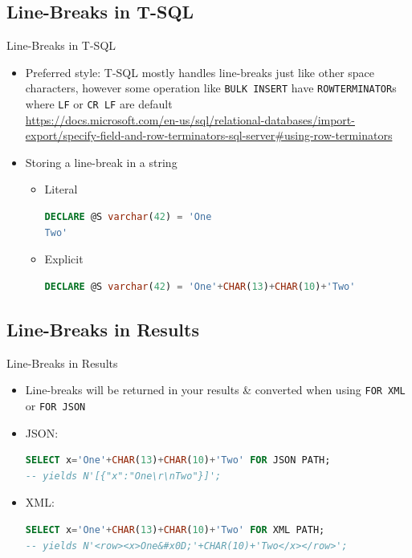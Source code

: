 \documentclass[english,aspectratio=169]{beamer}
\begin{document}
\subsection{Line-Breaks in T-SQL}
\begin{frame}[fragile]{Line-Breaks in T-SQL}
\begin{itemize}
\item Preferred style: T-SQL mostly handles line-breaks just like other space characters, however some operation like \texttt{BULK INSERT} have \texttt{ROWTERMINATOR}s where \texttt{LF} or \texttt{CR LF} are default\\
    \url{https://docs.microsoft.com/en-us/sql/relational-databases/import-export/specify-field-and-row-terminators-sql-server#using-row-terminators}
\item Storing a line-break in a string
    \begin{itemize}
    \item Literal \begin{lstlisting}[language=SQL]
DECLARE @S varchar(42) = 'One
Two'
    \end{lstlisting}
    \item Explicit \begin{lstlisting}[language=SQL]
DECLARE @S varchar(42) = 'One'+CHAR(13)+CHAR(10)+'Two'
    \end{lstlisting}
    \end{itemize}
\end{itemize}
\end{frame}

\subsection{Line-Breaks in Results}
\begin{frame}[fragile]{Line-Breaks in Results}
\begin{itemize}
    \item Line-breaks will be returned in your results \& converted when using \texttt{FOR XML} or \texttt{FOR JSON}
    \item JSON: \begin{lstlisting}[language=SQL]
SELECT x='One'+CHAR(13)+CHAR(10)+'Two' FOR JSON PATH;
-- yields N'[{"x":"One\r\nTwo"}]';
    \end{lstlisting}
    \item XML: \begin{lstlisting}[language=SQL]
SELECT x='One'+CHAR(13)+CHAR(10)+'Two' FOR XML PATH;
-- yields N'<row><x>One&#x0D;'+CHAR(10)+'Two</x></row>';
    \end{lstlisting}
\end{itemize}
\end{frame}
\end{document}
